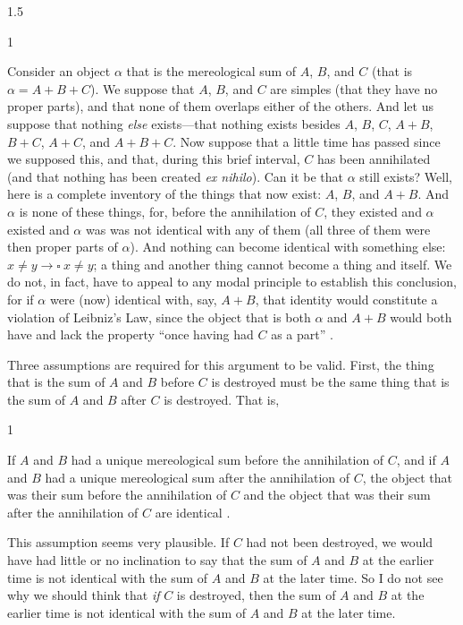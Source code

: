 \documentclass[11pt]{article}
\newenvironment{squote}{%
\begin{spacing}{1}
\begin{list}{}{%
\setlength{\labelwidth}{0pt}%
\rightmargin\leftmargin%
}
\item\relax
}{%
\end{list}%
\end{spacing}
}
\begin{document}
\begin{spacing}{1.5}
\begin{squote}
Consider an object $\alpha$ that is the mereological sum of $A$, $B$,
and $C$ (that is $\alpha = A + B + C$).  We suppose that $A$, $B$, and
$C$ are simples (that they have no proper parts), and that none of
them overlaps either of the others.  And let us suppose that nothing
{\em else} exists---that nothing exists besides $A$, $B$, $C$, $A +
B$, $B + C$, $A + C$, and $A + B + C$.  Now suppose that a little time
has passed since we supposed this, and that, during this brief
interval, $C$ has been annihilated (and that nothing has been created
{\em ex nihilo}).  Can it be that $\alpha$ still exists?  Well, here
is a complete inventory of the things that now exist: $A$, $B$, and $A
+ B$.  And $\alpha$ is none of these things, for, before the
annihilation of $C$, they existed and $\alpha$ existed and $\alpha$
was was not identical with any of them (all three of them were then
proper parts of $\alpha$).  And nothing can become identical with
something else: $x \neq y \rightarrow \square\ x \neq y$; a thing and
another thing cannot become a thing and itself.  We do not, in fact,
have to appeal to any modal principle to establish this conclusion,
for if $\alpha$ were (now) identical with, say, $A + B$, that identity
would constitute a violation of Leibniz's Law, since the object that
is both $\alpha$ and $A + B$ would both have and lack the property
``once having had $C$ as a part'' \citep[628]{inwagen2006}.
\end{squote}

Three assumptions are required for this argument to be valid.  First,
the thing that is the sum of $A$ and $B$ before $C$ is destroyed must
be the same thing that is the sum of $A$ and $B$ after $C$ is
destroyed.  That is,

\begin{squote}
If $A$ and $B$ had a unique mereological sum before the annihilation
of $C$, and if $A$ and $B$ had a unique mereological sum after the
annihilation of $C$, the object that was their sum before the
annihilation of $C$ and the object that was their sum after the
annihilation of $C$ are identical \citep[629]{inwagen2006}.
\end{squote}

This assumption seems very plausible.  If $C$ had not been destroyed,
we would have had little or no inclination to say that the sum of $A$
and $B$ at the earlier time is not identical with the sum of $A$ and
$B$ at the later time.  So I do not see why we should think that {\em
  if} $C$ is destroyed, then the sum of $A$ and $B$ at the earlier
time is not identical with the sum of $A$ and $B$ at the later time.


\end{spacing}
\end{document}

